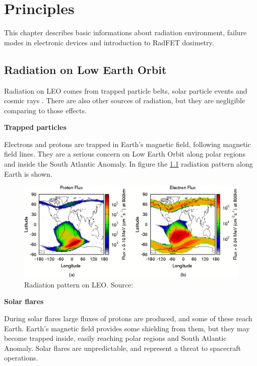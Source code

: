 \chapter{Principles}

This chapter describes basic informations about radiation environment, failure modes in electronic devices and introduction to RadFET dosimetry.

\section{Radiation on Low Earth Orbit}
    Radiation on LEO comes from trapped particle belts, solar particle events and cosmic rays \cite{ESA_radiation}. There are also other sources of radiation, but they are negligible comparing to those effects.

    \bigskip \textbf{Trapped particles}

    Electrons and protons are trapped in Earth's magnetic field, following magnetic field lines. They are a serious concern on Low Earth Orbit along polar regions and inside the South Atlantic Anomaly. In figure the \ref{Polar_SAA} radiation pattern along Earth is shown.

    \begin{figure}[H]
        \centering
        \includegraphics[width=0.8\paperwidth]{img/03/polar_SAA.png}
        \caption{Radiation pattern on LEO. Source: \cite{ESA_radiation}}
         \label{Polar_SAA}
    \end{figure}

    \bigskip \textbf{Solar flares}

    During solar flares large fluxes of protons are produced, and some of these reach Earth. Earth's magnetic field provides some shielding from them, but they may become trapped inside, easily reaching polar regions and South Atlantic Anomaly. Solar flares are unpredictable, and represent a threat to spacecraft operations.

